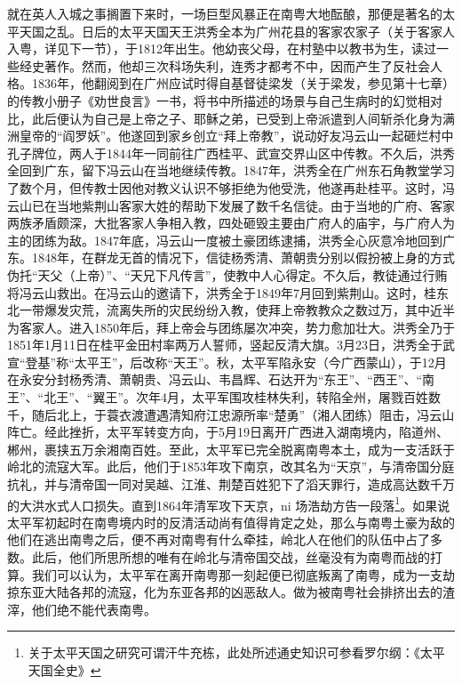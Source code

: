就在英人入城之事搁置下来时，一场巨型风暴正在南粤大地酝酿，那便是著名的太平天国之乱。日后的太平天国天王洪秀全本为广州花县的客家农家子（关于客家人入粤，详见下一节），于1812年出生。他幼丧父母，在村塾中以教书为生，读过一些经史著作。然而，他却三次科场失利，连秀才都考不中，因而产生了反社会人格。1836年，他翻阅到在广州应试时得自基督徒梁发（关于梁发，参见第十七章）的传教小册子《劝世良言》一书，将书中所描述的场景与自己生病时的幻觉相对比，此后便认为自己是上帝之子、耶稣之弟，已受到上帝派遣到人间斩杀化身为满洲皇帝的“阎罗妖”。他遂回到家乡创立“拜上帝教”，说动好友冯云山一起砸烂村中孔子牌位，两人于1844年一同前往广西桂平、武宣交界山区中传教。不久后，洪秀全回到广东，留下冯云山在当地继续传教。1847年，洪秀全在广州东石角教堂学习了数个月，但传教士因他对教义认识不够拒绝为他受洗，他遂再赴桂平。这时，冯云山已在当地紫荆山客家大姓的帮助下发展了数千名信徒。由于当地的广府、客家两族矛盾颇深，大批客家人争相入教，四处砸毁主要由广府人的庙宇，与广府人为主的团练为敌。1847年底，冯云山一度被土豪团练逮捕，洪秀全心灰意冷地回到广东。1848年，在群龙无首的情况下，信徒杨秀清、萧朝贵分别以假扮被上身的方式伪托“天父（上帝）”、“天兄下凡传言”，使教中人心得定。不久后，教徒通过行贿将冯云山救出。在冯云山的邀请下，洪秀全于1849年7月回到紫荆山。这时，桂东北一带爆发灾荒，流离失所的灾民纷纷入教，使拜上帝教教众之数过万，其中近半为客家人。进入1850年后，拜上帝会与团练屡次冲突，势力愈加壮大。洪秀全乃于1851年1月11日在桂平金田村率两万人誓师，竖起反清大旗。3月23日，洪秀全于武宣“登基”称“太平王”，后改称“天王”。秋，太平军陷永安（今广西蒙山），于12月在永安分封杨秀清、萧朝贵、冯云山、韦昌辉、石达开为“东王”、“西王”、“南王”、“北王”、“翼王”。次年4月，太平军围攻桂林失利，转陷全州，屠戮百姓数千，随后北上，于蓑衣渡遭遇清知府江忠源所率“楚勇”（湘人团练）阻击，冯云山阵亡。经此挫折，太平军转变方向，于5月19日离开广西进入湖南境内，陷道州、郴州，裹挟五万余湘南百姓。至此，太平军已完全脱离南粤本土，成为一支活跃于岭北的流寇大军。此后，他们于1853年攻下南京，改其名为“天京”，与清帝国分庭抗礼，并与清帝国一同对吴越、江淮、荆楚百姓犯下了滔天罪行，造成高达数千万的大洪水式人口损失。直到1864年清军攻下天京，ni 场浩劫方告一段落\footnote{关于太平天国之研究可谓汗牛充栋，此处所述通史知识可参看罗尔纲：《太平天国全史》}。如果说太平军初起时在南粤境内时的反清活动尚有值得肯定之处，那么与南粤土豪为敌的他们在逃出南粤之后，便不再对南粤有什么牵挂，岭北人在他们的队伍中占了多数。此后，他们所思所想的唯有在岭北与清帝国交战，丝毫没有为南粤而战的打算。我们可以认为，太平军在离开南粤那一刻起便已彻底叛离了南粤，成为一支劫掠东亚大陆各邦的流寇，化为东亚各邦的凶恶敌人。做为被南粤社会排挤出去的渣滓，他们绝不能代表南粤。

